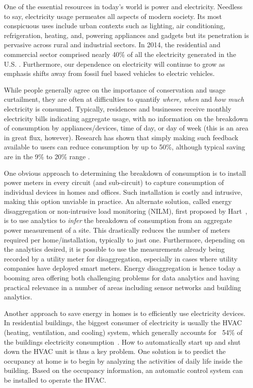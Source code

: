 One of the essential resources in today's world is power and electricity. Needless to say, electricity usage permeates all aspects of modern society.
Its most conspicuous
uses include urban contexts such as
lighting, air conditioning, refrigeration, heating, and, powering
appliances and gadgets but its penetration is pervasive across rural
and industrial sectors.
In 2014, the residential and commercial sector
comprised nearly 40\% of all the electricity generated in the U.S. \cite{book2014us}.
Furthermore, our dependence on electricity will continue to grow
as emphasis shifts away from fossil fuel based vehicles to electric
vehicles.

 

While people generally agree on the importance of conservation and
usage curtailment, they are often at difficulties to quantify 
{\em where, when} and {\em how much} electricity is consumed.
Typically, residences and businesses receive
monthly electricity bills indicating aggregate usage, with no information on
the breakdown of consumption by appliances/devices, time of day, or day of
week (this is an area in great flux, however). Research has 
shown that simply making such feedback available to users
can reduce consumption by up to 50\%, although typical saving 
are in the 9\% to 20\% range \cite{book2014us}.%

One obvious approach to determining the breakdown of consumption is to install
power meters in every circuit (and sub-circuit)
to capture consumption of individual devices in homes and
offices. Such installation is costly and intrusive, making 
this option unviable in practice. 
An alternate
solution, called energy disaggregation or non-intrusive load monitoring
(NILM),
first proposed by Hart~\cite{hart1992}, is to use analytics to 
{\em infer} the breakdown of consumption from an aggregate 
power measurement of a
site. This drastically reduces the number of meters required per 
home/installation, typically to just one. Furthermore, depending on the analytics desired, it is possible to
use the measurements already being recorded by a utility meter for
disaggregation, especially in cases where utility companies have deployed
smart meters.
Energy disaggregation is hence today a booming area offering both
challenging problems for data analytics and having practical relevance in a
number of areas including sensor networks and building analytics.

Another approach to save energy in homes is to 
efficiently use electricity devices.  
In residential buildings, 
the biggest consumer of electricity is usually the HVAC 
(heating, ventilation, and cooling) system, which generally accounts for ~54\% 
of the buildings electricity consumption~\cite{book2014us}. 
How to automatically start up and shut down the HVAC unit 
is thus a key problem. 
One solution is to predict the occupancy at home 
is to begin by analyzing the activities of daily life 
inside the building. 
Based on the occupancy information, 
an automatic control system can be installed
to operate the HVAC. 

